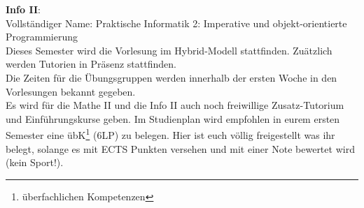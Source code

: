 \textbf{Info II}:\\
Vollständiger Name: Praktische Informatik 2: Imperative und objekt-orientierte Programmierung\\
Dieses Semester wird die Vorlesung im Hybrid-Modell stattfinden. Zuätzlich werden Tutorien in Präsenz stattfinden.\\

Die Zeiten für die Übungsgruppen werden innerhalb der ersten Woche in den Vorlesungen bekannt gegeben.\\
Es wird für die Mathe II und die Info II auch noch freiwillige Zusatz-Tutorium und Einführungskurse geben.
Im Studienplan wird empfohlen in eurem ersten Semester eine übK\footnote{überfachlichen Kompetenzen} (6LP) zu belegen. Hier ist euch völlig freigestellt was ihr belegt, solange es mit ECTS Punkten versehen und mit einer Note bewertet wird (kein Sport!).
